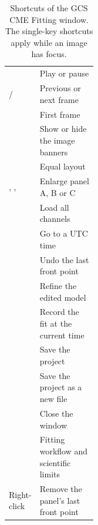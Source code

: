 \begin{table}[!htbp]
  \centering
  \caption{Shortcuts of the GCS CME Fitting window. The single-key shortcuts apply while an image has focus.}
  \label{tab:keys-gcs}
  \small
  \begin{tabularx}{\linewidth}{@{}P{0.3\linewidth}L@{}}
    \toprule
     &  \\
    \midrule
     & Play or pause \\
     /  & Previous or next frame \\
     & First frame \\
     & Show or hide the image banners \\
     & Equal layout \\
    , ,  & Enlarge panel A, B or C \\
     & Load all channels \\
     & Go to a UTC time \\
     & Undo the last front point \\
     & Refine the edited model \\
     & Record the fit at the current time \\
     & Save the project \\
     & Save the project as a new file \\
     & Close the window \\
     & Fitting workflow and scientific limits \\
    Right-click & Remove the panel's last front point \\
    \bottomrule
  \end{tabularx}
\end{table}
